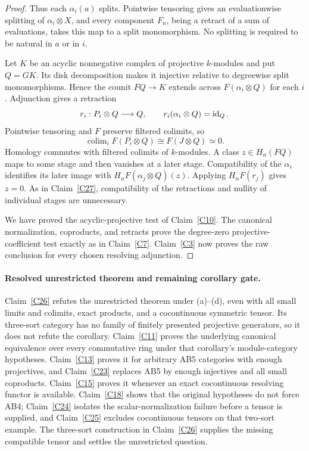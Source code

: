 \begin{proof}
Thus each $\alpha_i(a)$ splits. Pointwise tensoring gives an evaluationwise splitting of $\alpha_i\otimes X$, and every component $F_n$, being a retract of a sum of evaluations, takes this map to a split monomorphism. No splitting is required to be natural in $a$ or in $i$.

Let $K$ be an acyclic nonnegative complex of projective $k$-modules and put $Q=GK$. Its disk decomposition makes it injective relative to degreewise split monomorphisms. Hence the counit $FQ\to K$ extends across $F(\alpha_i\otimes Q)$ for each $i$. Adjunction gives a retraction
\[
 r_i:P_i\otimes Q\longrightarrow Q,
 \qquad r_i(\alpha_i\otimes Q)=\operatorname{id}_Q.
\]
Pointwise tensoring and $F$ preserve filtered colimits, so
\[
 \operatorname{colim}_i F(P_i\otimes Q)
 \cong F(J\otimes Q)\simeq0.
\]
Homology commutes with filtered colimits of $k$-modules. A class $z\in H_n(FQ)$ maps to some stage and then vanishes at a later stage. Compatibility of the $\alpha_i$ identifies its later image with $H_nF(\alpha_j\otimes Q)(z)$. Applying $H_nF(r_j)$ gives $z=0$. As in Claim~\ref{C27}, compatibility of the retractions and nullity of individual stages are unnecessary.

We have proved the acyclic-projective test of Claim~\ref{C10}. The canonical normalization, coproducts, and retracts prove the degree-zero projective-coefficient test exactly as in Claim~\ref{C7}. Claim~\ref{C3} now proves the raw conclusion for every chosen resolving adjunction.
\end{proof}

\paragraph{Resolved unrestricted theorem and remaining corollary gate.}
Claim~\ref{C26} refutes the unrestricted theorem under (a)--(d), even with all small limits and colimits, exact products, and a cocontinuous symmetric tensor. Its three-sort category has no family of finitely presented projective generators, so it does not refute the corollary. Claim~\ref{C11} proves the underlying canonical equivalence over every commutative ring under that corollary's module-category hypotheses. Claim~\ref{C13} proves it for arbitrary AB5 categories with enough projectives, and Claim~\ref{C23} replaces AB5 by enough injectives and all small coproducts. Claim~\ref{C15} proves it whenever an exact cocontinuous resolving functor is available. Claim~\ref{C18} shows that the original hypotheses do not force AB4; Claim~\ref{C24} isolates the scalar-normalization failure before a tensor is supplied, and Claim~\ref{C25} excludes cocontinuous tensors on that two-sort example. The three-sort construction in Claim~\ref{C26} supplies the missing compatible tensor and settles the unrestricted question.

